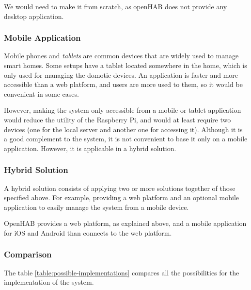We would need to make it from scratch, as openHAB does not provide any desktop application.

\subsubsection{Mobile Application}
Mobile phones and \textit{tablets} are common devices that are widely used to manage smart homes. Some setups have a tablet located 
somewhere in the home, which is only used for managing the domotic devices. An application is faster and more accessible than a web
platform, and users are more used to them, so it would be convenient in some cases.

However, making the system only accessible from a mobile or tablet application would reduce the utility of the Raspberry Pi, and 
would at least require two devices (one for the local server and another one for accessing it). Although it is a good complement to the
system, it is not convenient to base it only on a mobile application. However, it is applicable in a hybrid solution.

\subsubsection{Hybrid Solution}
A hybrid solution consists of applying two or more solutions together of those specified above. For example, providing a web platform 
and an optional mobile application to easily manage the system from a mobile device.

OpenHAB provides a web platform, as explained above, and a mobile application for iOS and Android than connects to the web platform.

\subsubsection{Comparison}
The table \ref{table:possible-implementations} compares all the possibilities for the implementation of the system.

